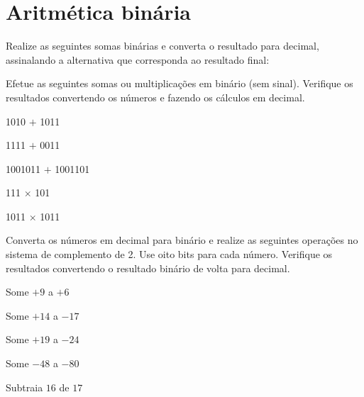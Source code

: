 

\def\itemlabel{a)}

\section*{Aritmética binária}

Realize as seguintes somas binárias e converta o resultado para
decimal, assinalando a alternativa que corresponda ao resultado final:

\exercise Efetue as seguintes somas ou multiplicações em binário (sem
sinal). Verifique os resultados convertendo os números e fazendo os
cálculos em decimal.

\begin{enumerate}[a)]
  \begin{minipage}{.45\linewidth}
  \item 1010 $+$ 1011
  \item 1111 $+$ 0011
  \item 1001011 $+$ 1001101
  \end{minipage}
  \begin{minipage}{.45\linewidth}
  \item 111 $\times$ 101
  \item 1011 $\times$ 1011
  \end{minipage}
\end{enumerate}

\exercise Converta os números em decimal para binário e realize as
seguintes operações no sistema de complemento de 2. Use oito bits para
cada número. Verifique os resultados convertendo o resultado binário
de volta para decimal.

\begin{enumerate}[a)]
    \begin{minipage}{.45\linewidth}
    \item Some $+9$ a $+6$
    \item Some $+14$ a $-17$
    \item Some $+19$ a $-24$
    \end{minipage}
    \begin{minipage}{.45\linewidth}
    \item Some $-48$ a $-80$
    \item Subtraia $16$ de $17$
    \end{minipage}
  \end{enumerate}


